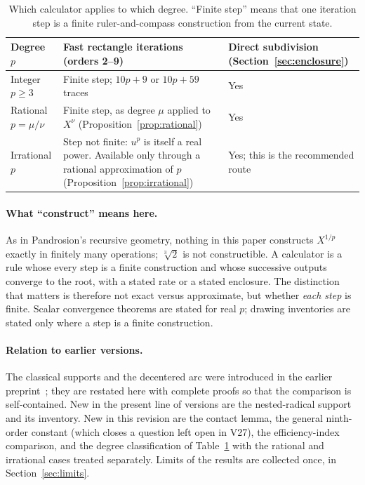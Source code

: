 \documentclass[10pt,a4paper]{article}
\theoremstyle{plain}
\theoremstyle{remark}
\numberwithin{equation}{section}
\begin{document}
\begin{table}[h]
\centering\small
\caption{Which calculator applies to which degree. ``Finite step'' means that one iteration step is a
finite ruler-and-compass construction from the current state.}\label{tab:degrees}
\begin{tabularx}{\linewidth}{@{}lXX@{}}
\toprule
Degree $p$ & Fast rectangle iterations (orders 2--9) & Direct subdivision (Section~\ref{sec:enclosure})\\
\midrule
Integer $p\ge 3$ & Finite step; $10p+9$ or $10p+59$ traces & Yes\\
Rational $p=\mu/\nu$ & Finite step, as degree $\mu$ applied to $X^{\nu}$ (Proposition~\ref{prop:rational}) & Yes\\
Irrational $p$ & Step not finite: $u^{p}$ is itself a real power. Available only through a rational
approximation of $p$ (Proposition~\ref{prop:irrational}) & Yes; this is the recommended route\\
\bottomrule
\end{tabularx}
\end{table}

\paragraph{What ``construct'' means here.}
As in Pandrosion's recursive geometry, nothing in this paper constructs $X^{1/p}$ exactly in finitely
many operations; $\sqrt[3]{2}$ is not constructible. A calculator is a rule whose every step is a finite
construction and whose successive outputs converge to the root, with a stated rate or a stated
enclosure. The distinction that matters is therefore not exact versus approximate, but whether
\emph{each step} is finite. Scalar convergence theorems are stated for real $p$; drawing inventories are
stated only where a step is a finite construction.

\paragraph{Relation to earlier versions.}
The classical supports and the decentered arc were introduced in the earlier preprint~\cite{v20}; they
are restated here with complete proofs so that the comparison is self-contained. New in the present line
of versions are the nested-radical support and its inventory. New in this revision are the contact lemma,
the general ninth-order constant (which closes a question left open in V27), the efficiency-index
comparison, and the degree classification of Table~\ref{tab:degrees} with the rational and irrational
cases treated separately. Limits of the results are collected once, in Section~\ref{sec:limits}.
\end{document}
